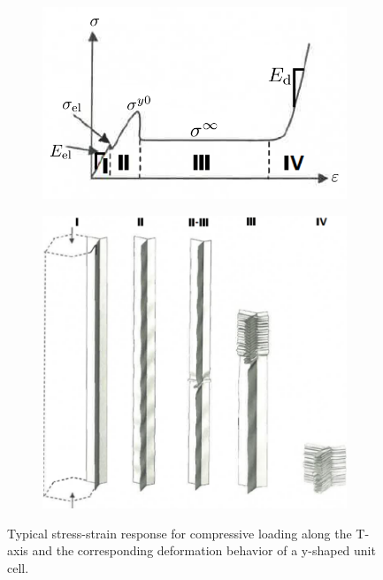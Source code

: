 \begin{figure}[H]
    \centering
    \begin{subfigure}[b]{0.50\textwidth}
    \centering
        \includegraphics[width=1\textwidth]{./Images/Ch2/Ch2_stressstrain.PNG}
    \end{subfigure}
    \begin{subfigure}[b]{0.35\textwidth}
    \centering
\includegraphics[width=1\textwidth]{./Images/Ch2/Ch2_crushfigure.PNG}
    \end{subfigure}
    \caption{Typical stress-strain response for compressive loading along the T-axis and the corresponding deformation behavior of a y-shaped unit cell.  \cite{niedermeyer}}
    \label{Ch2_stressstrain}
\end{figure}
